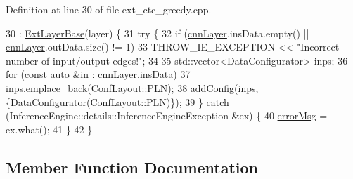 Definition at line 30 of file ext\+\_\+ctc\+\_\+greedy.\+cpp.


\begin{DoxyCode}
30                                                         : \hyperlink{classInferenceEngine_1_1Extensions_1_1Cpu_1_1ExtLayerBase_affff0e8263ca26852ccf71d299d7b06a}{ExtLayerBase}(layer) \{
31         \textcolor{keywordflow}{try} \{
32             \textcolor{keywordflow}{if} (\hyperlink{classInferenceEngine_1_1Extensions_1_1Cpu_1_1ExtLayerBase_a1074cdccacb9e9ca6eec01bbc2f7ca4a}{cnnLayer}.insData.empty() || \hyperlink{classInferenceEngine_1_1Extensions_1_1Cpu_1_1ExtLayerBase_a1074cdccacb9e9ca6eec01bbc2f7ca4a}{cnnLayer}.outData.size() != 1)
33                 THROW\_IE\_EXCEPTION << \textcolor{stringliteral}{"Incorrect number of input/output edges!"};
34 
35             std::vector<DataConfigurator> inps;
36             \textcolor{keywordflow}{for} (\textcolor{keyword}{const} \textcolor{keyword}{auto} &in : \hyperlink{classInferenceEngine_1_1Extensions_1_1Cpu_1_1ExtLayerBase_a1074cdccacb9e9ca6eec01bbc2f7ca4a}{cnnLayer}.insData)
37                 inps.emplace\_back(\hyperlink{classInferenceEngine_1_1Extensions_1_1Cpu_1_1ExtLayerBase_a1258a8d209e0249e0b1717618352ddfba446687ea2db1ada75be5ed053be77f59}{ConfLayout::PLN});
38             \hyperlink{classInferenceEngine_1_1Extensions_1_1Cpu_1_1ExtLayerBase_a0ac7a6632e95b9500d5246b05b4b0bfa}{addConfig}(inps, \{DataConfigurator(\hyperlink{classInferenceEngine_1_1Extensions_1_1Cpu_1_1ExtLayerBase_a1258a8d209e0249e0b1717618352ddfba446687ea2db1ada75be5ed053be77f59}{ConfLayout::PLN})\});
39         \} \textcolor{keywordflow}{catch} (InferenceEngine::details::InferenceEngineException &ex) \{
40             \hyperlink{classInferenceEngine_1_1Extensions_1_1Cpu_1_1ExtLayerBase_abc78e9b5a79fa339ffd831a5318f71f7}{errorMsg} = ex.what();
41         \}
42     \}
\end{DoxyCode}


\subsection{Member Function Documentation}

